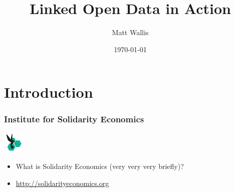 
\usepackage{beamerthemesplit}
\usepackage{textpos} 
\usepackage{hyperref}
\usepackage{graphicx}


\title{Linked Open Data in Action}
\author{Matt Wallis}
\date{\today}



\frame{\titlepage}

\section[Outline]{}
\frame{\tableofcontents}

\section{Introduction}
\frame
{
  \frametitle{Institute for Solidarity Economics}
  \begin{center}
    \includegraphics[height=1cm,width=1cm]{ise-logo.jpg}
  \end{center}

  \begin{itemize}
    \item What is Solidarity Economics (very very very briefly)?
    \item \url{http://solidarityeconomics.org}
  \end{itemize}
}
